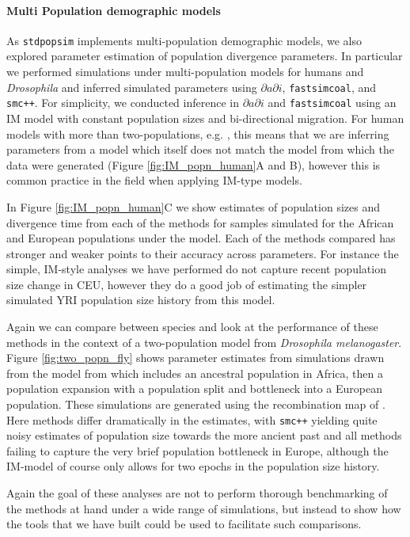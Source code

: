 \documentclass[12pt,halfline,a4paper]{ouparticle}
\newcommand{\dadi}{$\partial a \partial i$\xspace}
\newcommand{\smcpp}{\texttt{smc++}\xspace}
\newcommand{\fastsimcoal}{\texttt{fastsimcoal}\xspace}
\begin{document}
\paragraph*{Multi Population demographic models}
As \texttt{stdpopsim} implements multi-population demographic models, we also
explored parameter estimation of population divergence parameters. In particular
we performed simulations under multi-population models for humans and \emph{Drosophila}
and inferred simulated parameters using \dadi, \fastsimcoal, and \smcpp.
For simplicity, we conducted inference in \dadi and \fastsimcoal using an IM model
with constant population sizes and bi-directional migration. For human
models with more than two-populations, e.g. \cite{gutenkunst2009inferring},
this means that we are inferring parameters from a model which itself does
not match the model from which the data were generated (Figure
\ref{fig:IM_popn_human}A and B), however this is common practice in the field
when applying IM-type models.

In Figure \ref{fig:IM_popn_human}C we show estimates of population sizes and divergence
time from each of the methods for samples simulated for the African and European populations
under the \cite{gutenkunst2009inferring} model. Each of the methods compared has stronger
and weaker points to their accuracy across parameters. For instance the simple, IM-style
analyses we have performed do not capture recent population size change in CEU, however
they do a good job of estimating the simpler simulated YRI population size history from this model.

Again we can compare between species and look at the performance of these methods in
the context of a two-population model from \emph{Drosophila melanogaster}. Figure
\ref{fig:two_popn_fly} shows parameter estimates from simulations drawn from
the model from \cite{li2006inferring} which includes
an ancestral population in Africa, then a population expansion with a population
split and bottleneck into a European population. These simulations are generated
using the recombination map of \cite{comeron2012many}. Here methods differ dramatically
in the estimates, with \smcpp yielding quite noisy estimates of population size
towards the more ancient past and all methods failing to capture the very brief
population bottleneck in Europe, although the IM-model of course only allows for
two epochs in the population size history.

Again the goal of these analyses are not to perform thorough benchmarking of
the methods at hand under a wide range of simulations, but instead to show how
the tools that we have built could be used to facilitate such comparisons.
\end{document}
